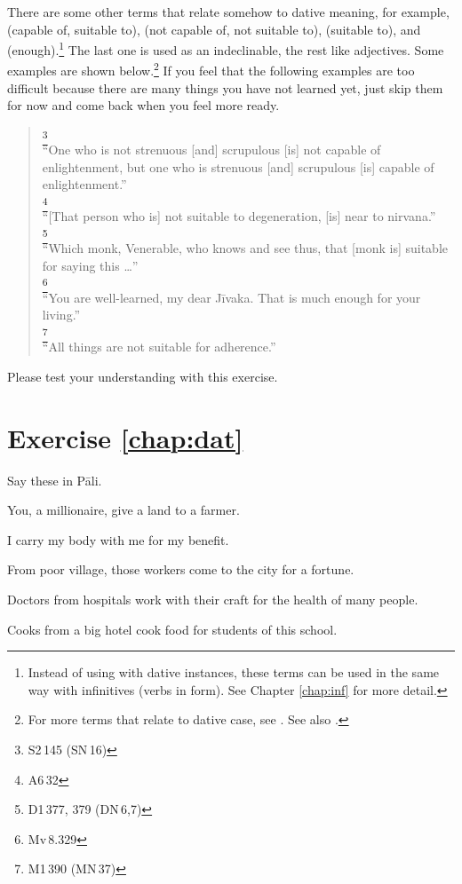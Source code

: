 There are some other terms that relate somehow to dative meaning, for example,  (capable of, suitable to),  (not capable of, not suitable to),  (suitable to), and  (enough).\footnote{Instead of using with dative instances, these terms can be used in the same way with infinitives (verbs in  form). See Chapter \ref{chap:inf} for more detail.} The last one is used as an indeclinable, the rest like adjectives. Some examples are shown below.\footnote{For more terms that relate to dative case, see \citealp[pp.~67--9]{warder:intro}. See also \citealp[pp.~326--7]{perniola:grammar}.} If you feel that the following examples are too difficult because there are many things you have not learned yet, just skip them for now and come back when you feel more ready.

\begin{quote}
\footnote{S2\,145 (SN\,16)}\\
``One who is not strenuous [and] scrupulous [is] not capable of enlightenment, but one who is strenuous [and] scrupulous [is] capable of enlightenment.'' \\[1.5mm]
\footnote{A6\,32}\\
	``[That person who is] not suitable to degeneration, [is] near to nirvana.'' \\[1.5mm]
\footnote{D1\,377, 379 (DN\,6,7)}\\
``Which monk, Venerable, who knows and see thus, that [monk is] suitable for saying this \ldots'' \\[1.5mm]
\footnote{Mv\,8.329}\\
``You are well-learned, my dear J\=ivaka. That is much enough for your living.'' \\[1.5mm]
\footnote{M1\,390 (MN\,37)}\\
``All things are not suitable for adherence.''
\end{quote}

Please test your understanding with this exercise.

\section*{Exercise \ref{chap:dat}}
Say these in P\=ali.
\begin{compactenum}
\item You, a millionaire, give a land to a farmer.
\item I carry my body with me for my benefit.
\item From poor village, those workers come to the city for a fortune.
\item Doctors from hospitals work with their craft for the health of many people.
\item Cooks from a big hotel cook food for students of this school.
\end{compactenum}
